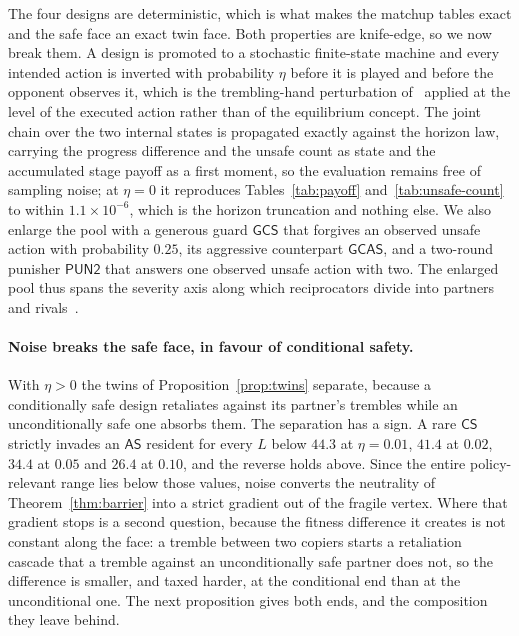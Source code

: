 \documentclass[11pt,a4paper]{article}
\theoremstyle{definition}
\newcommand{\AS}{\textsf{AS}}
\newcommand{\CS}{\textsf{CS}}
\begin{document}
The four designs are deterministic, which is what makes the matchup tables
exact and the safe face an exact twin face. Both properties are knife-edge, so
we now break them. A design is promoted to a stochastic finite-state machine
and every intended action is inverted with probability $\eta$ before it is
played and before the opponent observes it, which is the trembling-hand
perturbation of~\citet{selten1975reexamination} applied at the level of the
executed action rather than of the equilibrium concept. The joint chain over
the two
internal states is propagated exactly against the horizon law, carrying the
progress difference and the unsafe count as state and the accumulated stage
payoff as a first moment, so the evaluation remains free of sampling noise; at
$\eta=0$ it reproduces Tables~\ref{tab:payoff} and~\ref{tab:unsafe-count} to
within $1.1\times10^{-6}$, which is the horizon truncation and nothing else. We also enlarge the pool with a
generous guard $\mathsf{GCS}$ that forgives an observed unsafe action with
probability $0.25$, its aggressive counterpart $\mathsf{GCAS}$, and a
two-round punisher $\mathsf{PUN2}$ that answers one observed unsafe action
with two. The enlarged pool thus spans the severity axis along which
reciprocators divide into partners and rivals~\citep{hilbe2018partners}.

\paragraph{Noise breaks the safe face, in favour of conditional safety.}
With $\eta>0$ the twins of Proposition~\ref{prop:twins} separate, because a
conditionally safe design retaliates against its partner's trembles while an
unconditionally safe one absorbs them. The separation has a sign. A rare $\CS$
strictly invades an $\AS$ resident for every $L$ below $44.3$ at $\eta=0.01$,
$41.4$ at $0.02$, $34.4$ at $0.05$ and $26.4$ at $0.10$, and the reverse
holds above. Since the entire policy-relevant range lies below those values,
noise converts the neutrality of Theorem~\ref{thm:barrier} into a strict
gradient out of the fragile vertex. Where that gradient stops is a second
question, because the fitness difference it creates is not constant along the
face: a tremble between two copiers starts a retaliation cascade that a
tremble against an unconditionally safe partner does not, so the difference
is smaller, and taxed harder, at the conditional end than at the
unconditional one. The next proposition gives both ends, and the composition
they leave behind.
\end{document}
